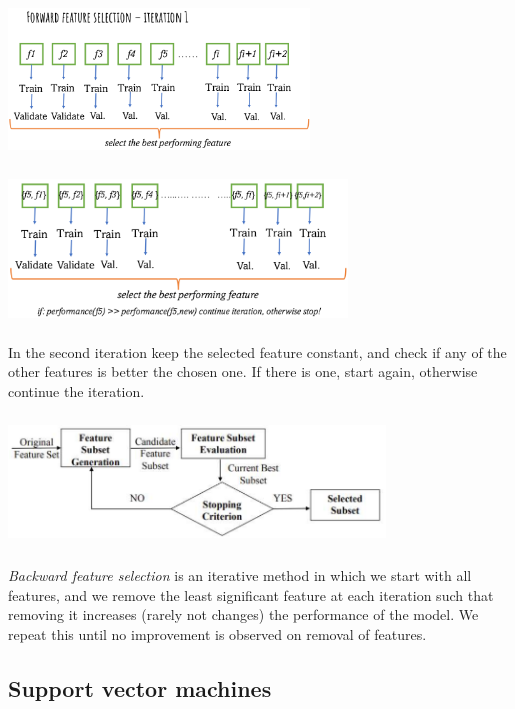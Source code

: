 \documentclass{article}
\begin{document}
\begin{minipage}{0.45\linewidth}
\includegraphics[width=8cm, height=4cm]{img/feat_selection3.png}
\end{minipage}
\hfill
\begin{minipage}{0.45\linewidth}
\includegraphics[width=9cm, height=4cm]{img/feat_selection4.png}	
\end{minipage}

In the second iteration keep the selected feature constant, and check if any of the other features is better the chosen one. If there is one, start again, otherwise continue the iteration.

\bigskip\bigskip

\centering\includegraphics[width=10cm, height=3.5cm]{img/feat_selection5.png}	

	
\raggedright \emph{Backward feature selection} is an iterative method in which we start with all features, and we remove the least significant feature at each iteration such that removing it increases (rarely not changes) the performance of the model. We repeat this until no improvement is observed on removal of features.

\bigskip\bigskip


\subsection*{Support vector machines}
\end{document}

